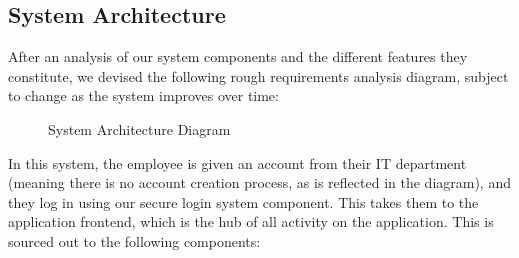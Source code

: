 \subsection{System Architecture}

After an analysis of our system components and the different features they constitute, we devised the following rough requirements analysis diagram, subject to change as the system improves over time:

\begin{figure}[H]
    \centering
    
    \caption{System Architecture Diagram}
    \label{fig:system_architecture_diagram}
\end{figure}

In this system, the employee is given an account from their IT department (meaning there is no account creation process, as is reflected in the diagram), and they log in using our secure login system component.  This takes them to the application frontend, which is the hub of all activity on the application. This is sourced out to the following components:


